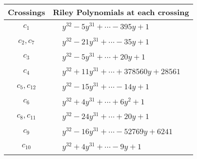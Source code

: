 \documentclass[1p]{elsarticle_modified}
\theoremstyle{definition}
\begin{document}
\begin{tabular}{m{50pt}|m{274pt}}
Crossings & \hspace{64pt}Riley Polynomials at each crossing \\
\hline $$\begin{aligned}c_{1}\end{aligned}$$&$\begin{aligned}
&y^{32}-5 y^{31}+\cdots-395 y+1
\end{aligned}$\\
\hline $$\begin{aligned}c_{2},c_{7}\end{aligned}$$&$\begin{aligned}
&y^{32}-21 y^{31}+\cdots-35 y+1
\end{aligned}$\\
\hline $$\begin{aligned}c_{3}\end{aligned}$$&$\begin{aligned}
&y^{32}-5 y^{31}+\cdots+20 y+1
\end{aligned}$\\
\hline $$\begin{aligned}c_{4}\end{aligned}$$&$\begin{aligned}
&y^{32}+11 y^{31}+\cdots+378560 y+28561
\end{aligned}$\\
\hline $$\begin{aligned}c_{5},c_{12}\end{aligned}$$&$\begin{aligned}
&y^{32}-15 y^{31}+\cdots-14 y+1
\end{aligned}$\\
\hline $$\begin{aligned}c_{6}\end{aligned}$$&$\begin{aligned}
&y^{32}+4 y^{31}+\cdots+6 y^2+1
\end{aligned}$\\
\hline $$\begin{aligned}c_{8},c_{11}\end{aligned}$$&$\begin{aligned}
&y^{32}-24 y^{31}+\cdots+20 y+1
\end{aligned}$\\
\hline $$\begin{aligned}c_{9}\end{aligned}$$&$\begin{aligned}
&y^{32}-16 y^{31}+\cdots-52769 y+6241
\end{aligned}$\\
\hline $$\begin{aligned}c_{10}\end{aligned}$$&$\begin{aligned}
&y^{32}+4 y^{31}+\cdots-9 y+1
\end{aligned}$\\
\hline
\end{tabular}\\~\\
\end{document}
